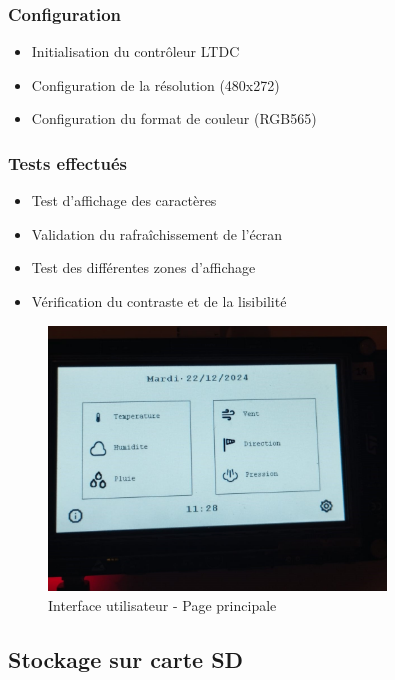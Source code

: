 \documentclass[12pt]{article}
\begin{document}
\subsubsection{Configuration}
\begin{itemize}
    \item Initialisation du contrôleur LTDC
    \item Configuration de la résolution (480x272)
    \item Configuration du format de couleur (RGB565)
\end{itemize}

\subsubsection{Tests effectués}
\begin{itemize}
    \item Test d'affichage des caractères
    \item Validation du rafraîchissement de l'écran
    \item Test des différentes zones d'affichage
    \item Vérification du contraste et de la lisibilité
\end{itemize}

\begin{figure}[H]
    \capstart
    \centering
    \includegraphics[width=0.8\textwidth]{./images/interface_mainpage.jpg}
    \caption{Interface utilisateur - Page principale}
    \label{fig:interface_mainpage}
\end{figure}

\subsection{Stockage sur carte SD}
\end{document}
